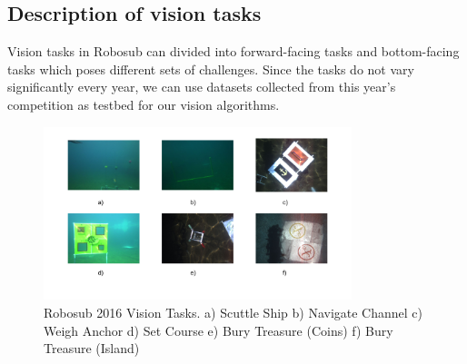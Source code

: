 \documentclass[hyp]{socreport}
\begin{document}
\subsection{Description of vision tasks}
Vision tasks in Robosub can divided into forward-facing tasks and
bottom-facing tasks which poses different sets of challenges. Since the
tasks do not vary significantly every year, we can use datasets
collected from this year's competition as testbed for our vision
algorithms.

\begin{figure}[ht]
\centering

        \includegraphics[width=0.8\textwidth, height=0.3\textheight]{robosub_vision_tasks.png}
        \caption{Robosub 2016 Vision Tasks. a) Scuttle Ship b) Navigate
        Channel c) Weigh Anchor d) Set Course e) Bury Treasure (Coins)
        f) Bury Treasure (Island)}
        \label{fig:robosub2016_tasks}

\end{figure}
\end{document}
